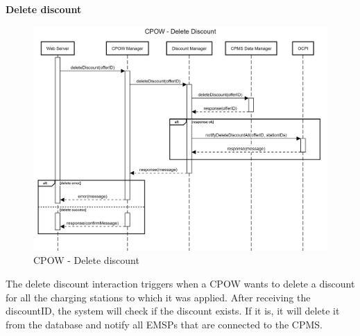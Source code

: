 \documentclass[table, 12pt]{article}
\begin{document}
\textbf{Delete discount}
\begin{center}
    \begin{figure}[H]
        \includegraphics[scale=0.15, center]{assets/sequenceDiagrams/CPOW delete discount.png}
        \caption{CPOW - Delete discount}
        \label{CPOW - Delete discount}
    \end{figure}
\end{center}
The delete discount interaction triggers when a CPOW wants to delete a discount for all the charging stations to which it was applied.
After receiving the discountID, the system will check if the discount exists. If it is, it will delete it from the database and notify all EMSPs that are connected to the CPMS.
\newpage
\end{document}
